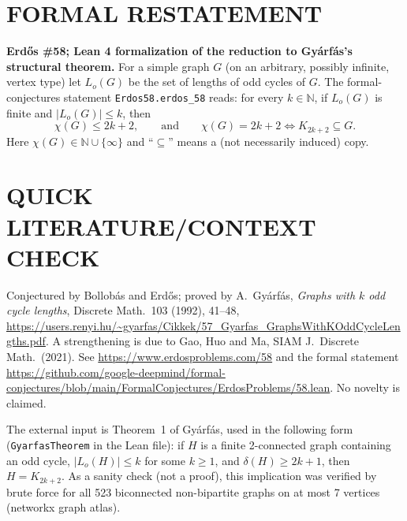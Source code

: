 \section{FORMAL RESTATEMENT}
\textbf{Erd\H{o}s \#58; Lean 4 formalization of the reduction to Gy\'arf\'as's structural theorem.}
For a simple graph $G$ (on an arbitrary, possibly infinite, vertex type) let $L_o(G)$ be the set of lengths of odd cycles of $G$. The formal-conjectures statement \texttt{Erdos58.erdos\_58} reads: for every $k\in\mathbb{N}$, if $L_o(G)$ is finite and $|L_o(G)|\le k$, then
\[
 \chi(G)\le 2k+2,\qquad\text{and}\qquad \chi(G)=2k+2 \iff K_{2k+2}\subseteq G .
\]
Here $\chi(G)\in\mathbb{N}\cup\{\infty\}$ and ``$\subseteq$'' means a (not necessarily induced) copy.

\section{QUICK LITERATURE/CONTEXT CHECK}
Conjectured by Bollob\'as and Erd\H{o}s; proved by A.~Gy\'arf\'as, \emph{Graphs with $k$ odd cycle lengths}, Discrete Math.\ 103 (1992), 41--48, \url{https://users.renyi.hu/~gyarfas/Cikkek/57_Gyarfas_GraphsWithKOddCycleLengths.pdf}. A strengthening is due to Gao, Huo and Ma, SIAM J.\ Discrete Math.\ (2021). See \url{https://www.erdosproblems.com/58} and the formal statement \url{https://github.com/google-deepmind/formal-conjectures/blob/main/FormalConjectures/ErdosProblems/58.lean}. No novelty is claimed.

The external input is Theorem~1 of Gy\'arf\'as, used in the following form (\texttt{GyarfasTheorem} in the Lean file): if $H$ is a finite 2-connected graph containing an odd cycle, $|L_o(H)|\le k$ for some $k\ge1$, and $\delta(H)\ge 2k+1$, then $H=K_{2k+2}$. As a sanity check (not a proof), this implication was verified by brute force for all 523 biconnected non-bipartite graphs on at most 7 vertices (networkx graph atlas).

